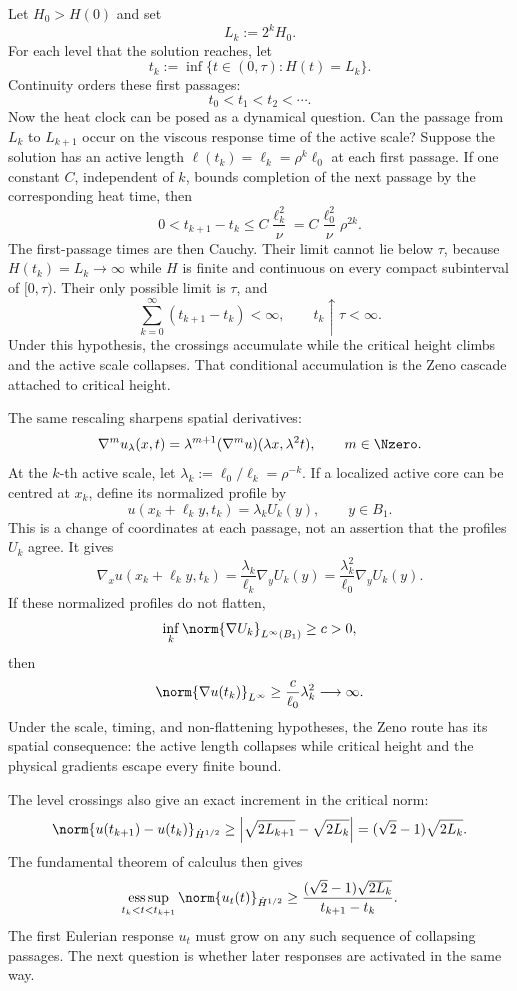 Let \(H_0>H(0)\) and set
\[
  L_k:=2^kH_0.
\]
For each level that the solution reaches, let
\[
  t_k:=\inf\{t\in(0,\tau):H(t)=L_k\}.
\]
Continuity orders these first passages:
\[
  t_0<t_1<t_2<\cdots.
\]
Now the heat clock can be posed as a dynamical question.
Can the passage from \(L_k\) to \(L_{k+1}\) occur on the viscous response time of the active scale?
Suppose the solution has an active length \(\ell(t_k)=\ell_k=\rho^k\ell_0\) at each first passage.
If one constant \(C\), independent of \(k\), bounds completion of the next passage by the corresponding heat time, then
\[
  0<t_{k+1}-t_k
  \leq
  C\frac{\ell_k^2}{\nu}
  =
  C\frac{\ell_0^2}{\nu}\rho^{2k}.
\]
The first-passage times are then Cauchy.
Their limit cannot lie below \(\tau\), because \(H(t_k)=L_k\to\infty\) while \(H\) is finite and continuous on every compact subinterval of \([0,\tau)\).
Their only possible limit is \(\tau\), and
\[
  \sum_{k=0}^{\infty}(t_{k+1}-t_k)<\infty,
  \qquad
  t_k\uparrow\tau<\infty.
\]
Under this hypothesis, the crossings accumulate while the critical height climbs and the active scale collapses.
That conditional accumulation is the Zeno cascade attached to critical height.

The same rescaling sharpens spatial derivatives:
\[
  \nabla^m u_\lambda(x,t)
  =\lambda^{m+1}(\nabla^m u)(\lambda x,\lambda^2t),
  \qquad
  m\in\Nzero.
\]
At the \(k\)-th active scale, let \(\lambda_k:=\ell_0/\ell_k=\rho^{-k}\).
If a localized active core can be centred at \(x_k\), define its normalized profile by
\[
  u\!\left(x_k+\ell_k y,t_k\right)
  =\lambda_k U_k(y),
  \qquad y\in B_1.
\]
This is a change of coordinates at each passage, not an assertion that the profiles \(U_k\) agree.
It gives
\[
  \nabla_xu\!\left(x_k+\ell_k y,t_k\right)
  =\frac{\lambda_k}{\ell_k}\nabla_yU_k(y)
  =\frac{\lambda_k^2}{\ell_0}\nabla_yU_k(y).
\]
If these normalized profiles do not flatten,
\[
  \inf_k\norm{\nabla U_k}_{L^\infty(B_1)}\geq c>0,
\]
then
\[
  \norm{\nabla u(t_k)}_{L^\infty}
  \geq \frac{c}{\ell_0}\lambda_k^2
  \longrightarrow\infty.
\]
Under the scale, timing, and non-flattening hypotheses, the Zeno route has its spatial consequence: the active length collapses while critical height and the physical gradients escape every finite bound.

The level crossings also give an exact increment in the critical norm:
\[
  \norm{u(t_{k+1})-u(t_k)}_{\dot H^{1/2}}
  \geq
  \left|\sqrt{2L_{k+1}}-\sqrt{2L_k}\right|
  =
  (\sqrt2-1)\sqrt{2L_k}.
\]
The fundamental theorem of calculus then gives
\[
  \operatorname*{ess\,sup}_{t_k<t<t_{k+1}}
  \norm{u_t(t)}_{\dot H^{1/2}}
  \geq
  \frac{(\sqrt2-1)\sqrt{2L_k}}{t_{k+1}-t_k}.
\]
The first Eulerian response \(u_t\) must grow on any such sequence of collapsing passages.
The next question is whether later responses are activated in the same way.
